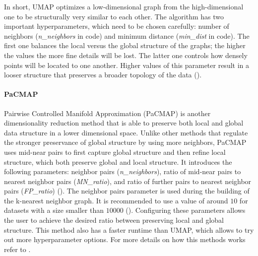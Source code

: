 In short, UMAP optimizes a low-dimensional graph from the high-dimensional one to be structurally very similar to each other. The algorithm has two important hyperparameters, which need to be chosen carefully: number of neighbors (\textit{n\_neighbors} in code) and minimum distance (\textit{min\_dist} in code). The first one balances the local versus the global structure of the graphs; the higher the values the more fine details will be lost. The latter one controls how densely points will be located to one another. Higher values of this parameter result in a looser structure that preserves a broader topology of the data (\cite{umap_web}).

\paragraph{PaCMAP}\label{section:pacmap}
Pairwise Controlled Manifold Approximation (PaCMAP) is another dimensionality reduction method that is able to preserve both local and global data structure in a lower dimensional space. Unlike other methods that regulate the stronger preservance of global structure by using more neighbors, PaCMAP uses mid-near pairs to first capture global structure and then refine local structure, which both preserve global and local structure. It introduces the following parameters: neighbor pairs (\textit{n\_neighbors}), ratio of mid-near pairs to nearest neighbor pairs (\textit{MN\_ratio}), and ratio of further pairs to nearest neighbor pairs (\textit{FP\_ratio}) (\cite{Wang_2021}). The neighbor pairs parameter is used during the building of the k-nearest neighbor graph. It is recommended to use a value of around $10$ for datasets with a size smaller than $10000$ (\cite{Yingfan_git}). Configuring these parameters allows the user to achieve the desired ratio between preserving local and global structure. This method also has a faster runtime than UMAP, which allows to try out more hyperparameter options. For more details on how this methods works refer to \cite{Wang_2021}.
